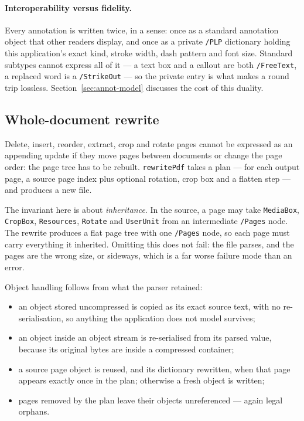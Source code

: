 \paragraph{Interoperability versus fidelity.} Every annotation is written twice, in a sense:
once as a standard annotation object that other readers display, and once as a private
\texttt{/PLP} dictionary holding this application's exact kind, stroke width, dash pattern and
font size. Standard subtypes cannot express all of it --- a text box and a callout are both
\texttt{/FreeText}, a replaced word is a \texttt{/StrikeOut} --- so the private entry is what
makes a round trip lossless. Section~\ref{sec:annot-model} discusses the cost of this duality.

\subsection{Whole-document rewrite}
\label{sec:rewrite}

Delete, insert, reorder, extract, crop and rotate pages cannot be expressed as an appending
update if they move pages between documents or change the page order: the page tree has to be
rebuilt. \texttt{rewritePdf} takes a plan --- for each output page, a source page index plus
optional rotation, crop box and a flatten step --- and produces a new file.

The invariant here is about \emph{inheritance}. In the source, a page may take
\texttt{MediaBox}, \texttt{CropBox}, \texttt{Resources}, \texttt{Rotate} and
\texttt{UserUnit} from an intermediate \texttt{/Pages} node. The rewrite produces a flat page
tree with one \texttt{/Pages} node, so each page must carry everything it inherited.
Omitting this does not fail: the file parses, and the pages are the wrong size, or sideways,
which is a far worse failure mode than an error.

Object handling follows from what the parser retained:

\begin{itemize}
  \item an object stored uncompressed is copied as its exact source text, with no
        re-serialisation, so anything the application does not model survives;
  \item an object inside an object stream is re-serialised from its parsed value, because its
        original bytes are inside a compressed container;
  \item a source page object is reused, and its dictionary rewritten, when that page appears
        exactly once in the plan; otherwise a fresh object is written;
  \item pages removed by the plan leave their objects unreferenced --- again legal orphans.
\end{itemize}

